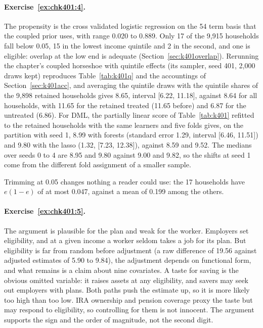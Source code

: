 \paragraph{Exercise~\ref{ex:chk401:4}.} The propensity is the cross validated logistic regression on the 54 term basis that the coupled prior uses, with range 0.020 to 0.889. Only 17 of the 9,915 households fall below 0.05, 15 in the lowest income quintile and 2 in the second, and one is eligible: overlap at the low end is adequate (Section~\ref{sec:k401overlap}). Rerunning the chapter's coupled horseshoe with quintile effects (its sampler, seed 401, 2,000 draws kept) reproduces Table~\ref{tab:k401q} and the accountings of Section~\ref{sec:k401acc}, and averaging the quintile draws with the quintile shares of the 9,898 retained households gives 8.65, interval [6.22, 11.18], against 8.64 for all households, with 11.65 for the retained treated (11.65 before) and 6.87 for the untreated (6.86). For DML, the partially linear score of Table~\ref{tab:k401} refitted to the retained households with the same learners and five folds gives, on the partition with seed 1, 8.99 with forests (standard error 1.29, interval [6.46, 11.51]) and 9.80 with the lasso (1.32, [7.23, 12.38]), against 8.59 and 9.52. The medians over seeds 0 to 4 are 8.95 and 9.80 against 9.00 and 9.82, so the shifts at seed 1 come from the different fold assignment of a smaller sample.

Trimming at 0.05 changes nothing a reader could use: the 17 households have $e(1 - e)$ of at most 0.047, against a mean of 0.199 among the others. 

\paragraph{Exercise~\ref{ex:chk401:5}.} The argument is plausible for the plan and weak for the worker. Employers set eligibility, and at a given income a worker seldom takes a job for its plan. But eligibility is far from random before adjustment (a raw difference of 19.56 against adjusted estimates of 5.90 to 9.84), the adjustment depends on functional form, and what remains is a claim about nine covariates. A taste for saving is the obvious omitted variable: it raises assets at any eligibility, and savers may seek out employers with plans. Both paths push the estimate up, so it is more likely too high than too low. IRA ownership and pension coverage proxy the taste but may respond to eligibility, so controlling for them is not innocent. The argument supports the sign and the order of magnitude, not the second digit.

